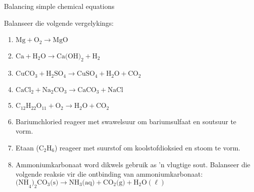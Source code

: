     \noindent

\begin{exercises}{Balancing simple chemical equations}
{
            \nopagebreak
Balanseer die volgende vergelykings:
\begin{enumerate}[noitemsep, label=\textbf{\arabic*}. ] 

\item  $\text{Mg} + {\text{O}}_{2} \to \text{MgO}$

\item ${\text{Ca}}+{\text{H}}_{2}\text{O} \to \text{Ca(OH)}_{2} + \text{H}_{2}$

\item ${\text{CuCO}}_{3} + {\text{H}}_{2}{\text{SO}}_{4} \to \text{CuSO}_{4} + {\text{H}}_{2}\text{O} + {\text{CO}}_{2}$

\item $\text{CaCl}_{2} + {\text{Na}}_{2}{\text{CO}}_{3} \to \text{CaCO}_{3} + {\text{NaCl}}$

\item ${\text{C}}_{12}{\text{H}}_{22}{\text{O}}_{11} + \text{O}_{2} \to \text{H}_{2}\text{O} + \text{CO}_{2}$

\item Bariumchloried reageer met swawelsuur om bariumsulfaat en soutsuur te vorm.

\item Etaan (${\text{C}}_{2}{\text{H}}_{6}$) reageer met suurstof om koolstofdioksied en stoom te vorm.

\item Ammoniumkarbonaat word dikwels gebruik as 'n vlugtige sout. Balanseer die volgende reaksie vir die ontbinding van ammoniumkarbonaat:\\ ${\text{(NH}_{4}{\text{)}}_{2}{\text{CO}}_{3} \text{(s)} \to {\text{NH}}_{3}\text{(aq)} + {\text{CO}}_{2} \text{(g)} + {\text{H}}_{2}\text{O} (\ell)}$


\end{enumerate}}
\end{exercises}
